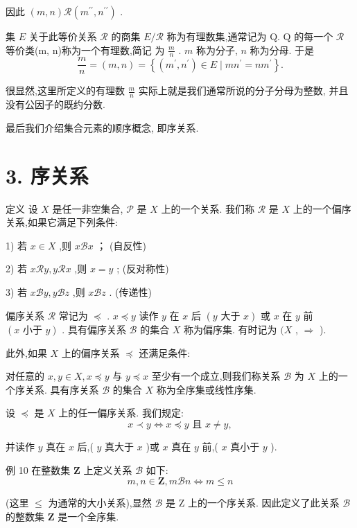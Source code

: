 因此 $\left( {m,n}\right) \mathcal{R}\left( {{m}^{\prime \prime },{n}^{\prime \prime }}\right)$ .

集 $E$ 关于此等价关系 $\mathcal{R}$ 的商集 $E/\mathcal{R}$ 称为有理数集,通常记为 Q. $\mathrm{Q}$ 的每一个 $\mathcal{R}$ 等价类(m, n)称为一个有理数,简记 为 $\frac{m}{n}$ . $m$ 称为分子, $n$ 称为分母. 于是
$$\frac{m}{n} = \left( {m,n}\right)  = \left\{  {\left( {{m}^{\prime },{n}^{\prime }}\right)  \in  E \mid  m{n}^{\prime } = n{m}^{\prime }}\right\}  .$$

很显然,这里所定义的有理数 $\frac{m}{n}$ 实际上就是我们通常所说的分子分母为整数, 并且没有公因子的既约分数.

最后我们介绍集合元素的顺序概念, 即序关系.

\section*{3. 序关系}

定义 设 $X$ 是任一非空集合, $\mathcal{P}$ 是 $X$ 上的一个关系. 我们称 $\mathcal{R}$ 是 $X$ 上的一个偏序关系,如果它满足下列条件:

1) 若 $x \in  X$ ,则 $x\mathcal{B}x$ ； (自反性)

2) 若 $x\mathcal{R}y,y\mathcal{R}x$ ,则 $x = y$ ; (反对称性)

3) 若 $x\mathcal{B}y,y\mathcal{B}z$ ,则 $x\mathcal{B}z$ . (传递性)

偏序关系 $\mathcal{R}$ 常记为 $\preccurlyeq$ . $x \preccurlyeq  y$ 读作 $y$ 在 $x$ 后 $\left( {y\text{ 大于 }x}\right)$ 或 $x$ 在 $y$ 前 $\left( {x\text{ 小于 }y}\right)$ . 具有偏序关系 $\mathcal{B}$ 的集合 $X$ 称为偏序集. 有时记为 $(X$ , $\Rightarrow$ ).

此外,如果 $X$ 上的偏序关系 $\preccurlyeq$ 还满足条件:

对任意的 $x,y \in  X,x \preccurlyeq  y$ 与 $y \preccurlyeq  x$ 至少有一个成立,则我们称关系 $\mathcal{B}$ 为 $X$ 上的一个序关系. 具有序关系 $\mathcal{B}$ 的集合 $X$ 称为全序集或线性序集.

设 $\preccurlyeq$ 是 $X$ 上的任一偏序关系. 我们规定:
$$x \prec  y \Leftrightarrow  x \preccurlyeq  y\text{ 且 }x \neq  y,$$

并读作 $y$ 真在 $x$ 后,( $y$ 真大于 $x$ )或 $x$ 真在 $y$ 前,( $x$ 真小于 $y$ ).

例 10 在整数集 $\mathbf{Z}$ 上定义关系 $\mathcal{B}$ 如下:
$$m,n \in  \mathbf{Z},m\mathcal{B}n \Leftrightarrow  m \leq  n$$

(这里 $\leq$ 为通常的大小关系),显然 $\mathcal{B}$ 是 $\mathrm{Z}$ 上的一个序关系. 因此定义了此关系 $\mathcal{B}$ 的整数集 $\mathbf{Z}$ 是一个全序集.

